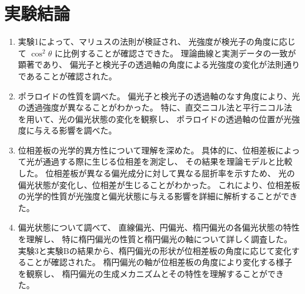 \documentclass{article}
\begin{document}
\section{実験結論}
\begin{enumerate}[label=\arabic*), before=\begin{spacing}{1.2}, after=\end{spacing}] %
    \item 実験1によって、マリュスの法則が検証され、
    光強度が検光子の角度に応じて $\cos^2 \theta$ に比例することが確認さできた。
    理論曲線と実測データの一致が顕著であり、
    偏光子と検光子の透過軸の角度による光強度の変化が法則通りであることが確認された。
    \item ポラロイドの性質を調べた。
    偏光子と検光子の透過軸のなす角度により、光の透過強度が異なることがわかった。
    特に、直交ニコル法と平行ニコル法を用いて、光の偏光状態の変化を観察し、
    ポラロイドの透過軸の位置が光強度に与える影響を調べた。
    \item 位相差板の光学的異方性について理解を深めた。
    具体的に、位相差板によって光が通過する際に生じる位相差を測定し、
    その結果を理論モデルと比較した。
    位相差板が異なる偏光成分に対して異なる屈折率を示すため、
    光の偏光状態が変化し、位相差が生じることがわかった。
    これにより、位相差板の光学的性質が光強度と偏光状態に与える影響を詳細に解析することができた。
    \item 偏光状態について調べて、
    直線偏光、円偏光、楕円偏光の各偏光状態の特性を理解し、
    特に楕円偏光の性質と楕円偏光の軸について詳しく調査した。
    実験3と実験Bの結果から、楕円偏光の形状が位相差板の角度に応じて変化することが確認された。
    楕円偏光の軸が位相差板の角度により変化する様子を観察し、
    楕円偏光の生成メカニズムとその特性を理解することができた。
\end{enumerate}


\end{document}
